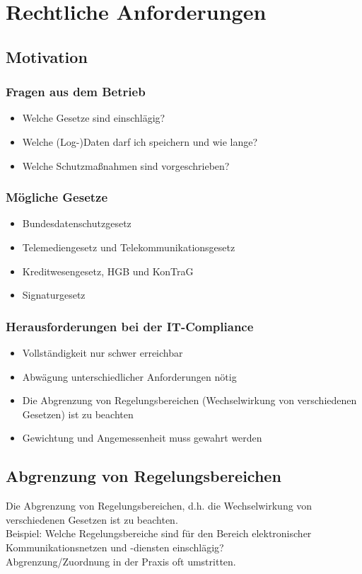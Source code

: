\section{Rechtliche Anforderungen}

\subsection{Motivation}

\subsubsection{Fragen aus dem Betrieb}
\begin{itemize}
	\item Welche Gesetze sind einschlägig?
	\item Welche (Log-)Daten darf ich speichern und wie lange?
	\item Welche Schutzmaßnahmen sind vorgeschrieben?
\end{itemize}

\subsubsection{Mögliche Gesetze}
\begin{itemize}
	\item Bundesdatenschutzgesetz
	\item Telemediengesetz und Telekommunikationsgesetz
	\item Kreditwesengesetz, HGB und KonTraG
	\item Signaturgesetz
\end{itemize}

\subsubsection{Herausforderungen bei der IT-Compliance}
\begin{itemize}
	\item Vollständigkeit nur schwer erreichbar
	\item Abwägung unterschiedlicher Anforderungen nötig
	\item Die Abgrenzung von Regelungsbereichen (Wechselwirkung von verschiedenen Gesetzen) ist zu beachten
	\item Gewichtung und Angemessenheit muss gewahrt werden
\end{itemize}

\subsection{Abgrenzung von Regelungsbereichen}
Die Abgrenzung von Regelungsbereichen, d.h. die Wechselwirkung von verschiedenen Gesetzen ist zu beachten.\\
Beispiel: Welche Regelungsbereiche sind für den Bereich elektronischer Kommunikationsnetzen und -diensten einschlägig?\\
Abgrenzung/Zuordnung in der Praxis oft umstritten.\\


